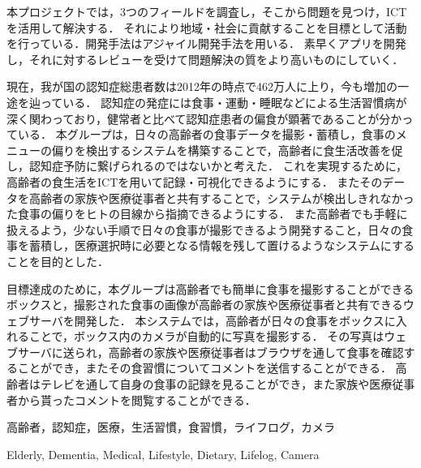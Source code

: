 \documentclass[../report]{subfiles}
\begin{document}
\begin{jabstract}
本プロジェクトでは，3つのフィールドを調査し，そこから問題を見つけ，ICTを活用して解決する．
それにより地域・社会に貢献することを目標として活動を行っている．開発手法はアジャイル開発手法を用いる．
素早くアプリを開発し，それに対するレビューを受けて問題解決の質をより高いものにしていく．

現在，我が国の認知症総患者数は2012年の時点で462万人に上り，今も増加の一途を辿っている．
認知症の発症には食事・運動・睡眠などによる生活習慣病が深く関わっており，健常者と比べて認知症患者の偏食が顕著であることが分かっている．
本グループは，日々の高齢者の食事データを撮影・蓄積し，食事のメニューの偏りを検出するシステムを構築することで，高齢者に食生活改善を促し，認知症予防に繋げられるのではないかと考えた．
これを実現するために，高齢者の食生活をICTを用いて記録・可視化できるようにする．
またそのデータを高齢者の家族や医療従事者と共有することで，システムが検出しきれなかった食事の偏りをヒトの目線から指摘できるようにする．
また高齢者でも手軽に扱えるよう，少ない手順で日々の食事が撮影できるよう開発すること，日々の食事を蓄積し，医療選択時に必要となる情報を残して置けるようなシステムにすることを目的とした．

目標達成のために，本グループは高齢者でも簡単に食事を撮影することができるボックスと，撮影された食事の画像が高齢者の家族や医療従事者と共有できるウェブサーバを開発した．
本システムでは，高齢者が日々の食事をボックスに入れることで，ボックス内のカメラが自動的に写真を撮影する．
その写真はウェブサーバに送られ，高齢者の家族や医療従事者はブラウザを通して食事を確認することができ，またその食習慣についてコメントを送信することができる．
高齢者はテレビを通して自身の食事の記録を見ることができ，また家族や医療従事者から貰ったコメントを閲覧することができる．
\begin{jkeyword}
高齢者，認知症，医療，生活習慣，食習慣，ライフログ，カメラ
\end{jkeyword}
\end{jabstract}


\begin{eabstract}
\begin{ekeyword}
Elderly, Dementia, Medical, Lifestyle, Dietary, Lifelog, Camera
\end{ekeyword}
\end{eabstract}
\end{document}

